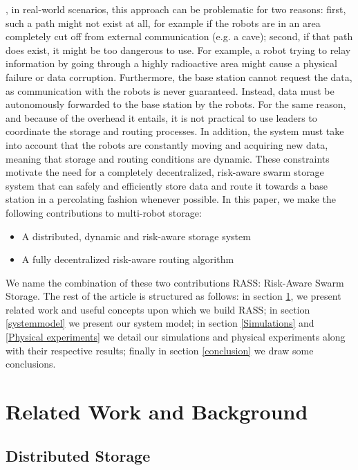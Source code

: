 \documentclass[sigconf]{aamas}
\begin{document}
\cite{dutta2020efficient}, in real-world scenarios, this approach can
be problematic for two reasons: first, such a path might not exist at
all, for example if the robots are in an area completely cut off from
external communication (e.g. a cave); second, if that path does exist,
it might be too dangerous to use. For example, a robot trying to relay
information by going through a highly radioactive area might cause a
physical failure or data corruption. Furthermore, the base station
cannot request the data, as communication with the robots is
never guaranteed. Instead, data must be autonomously forwarded to the base station
by the robots. For the same reason, and because of the overhead it
entails, it is not practical to use leaders to coordinate the storage
and routing processes. In addition, the system must take into account 
that the robots are constantly moving and acquiring new data,
meaning that storage and routing conditions are dynamic. These
constraints motivate the need for a completely decentralized,
risk-aware swarm storage system that can safely and efficiently store
data and route it towards a base station in a percolating fashion
whenever possible. In this paper, we make the following contributions
to multi-robot storage:

\begin{itemize}
    \item A distributed, dynamic and risk-aware storage system
    \item A fully decentralized risk-aware routing algorithm
\end{itemize}

We name the combination of these two contributions RASS: Risk-Aware Swarm Storage.
The rest of the article is structured as follows: in section \ref{relatedwork}, we
present related work and useful concepts upon which we build RASS; in section \ref{systemmodel} we present our system model; in section \ref{Simulations} and \ref{Physical experiments} we
detail our simulations and physical experiments along with their respective results; finally in section \ref{conclusion} we
draw some conclusions.

\section{Related Work and Background}
\label{relatedwork}

\subsection{Distributed Storage}
\end{document}
